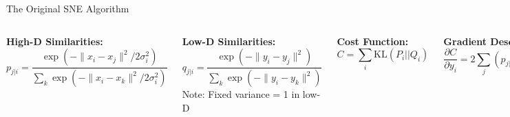 \documentclass[aspectratio=169]{beamer}
\begin{document}
\begin{frame}{The Original SNE Algorithm}
\begin{columns}
\textbf{High-D Similarities:}
$$p_{j|i} = \frac{\exp(-\|x_i-x_j\|^2/2\sigma_i^2)}{\sum_k \exp(-\|x_i-x_k\|^2/2\sigma_i^2)}$$

\textbf{Low-D Similarities:}
$$q_{j|i} = \frac{\exp(-\|y_i-y_j\|^2)}{\sum_k \exp(-\|y_i-y_k\|^2)}$$
Note: Fixed variance = 1 in low-D

\textbf{Cost Function:}
$$C = \sum_i \text{KL}(P_i||Q_i)$$

\textbf{Gradient Descent:}
$$\frac{\partial C}{\partial y_i} = 2\sum_j (p_{j|i} - q_{j|i})(y_i - y_j)$$

\includegraphics[width=\textwidth]{./Figures/sne_gradient_forces.png}
\end{columns}
\end{frame}
\end{document}
